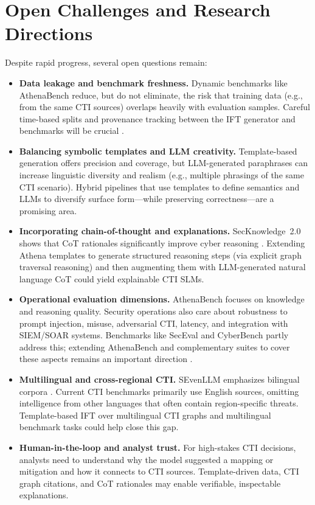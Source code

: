 \documentclass[unnumsec,webpdf,contemporary,large]{oup-authoring-template}
\theoremstyle{thmstyleone}
\theoremstyle{thmstyletwo}
\theoremstyle{thmstylethree}
\begin{document}
\section{Open Challenges and Research Directions}
\label{sec:open-challenges}

Despite rapid progress, several open questions remain:

\begin{itemize}
  \item \textbf{Data leakage and benchmark freshness.} Dynamic benchmarks like AthenaBench reduce, but do not eliminate, the risk that training data (e.g., from the same CTI sources) overlaps heavily with evaluation samples. Careful time-based splits and provenance tracking between the IFT generator and benchmarks will be crucial \cite{alam2025athenabench,cardei2025ift}.
  \item \textbf{Balancing symbolic templates and LLM creativity.} Template-based generation offers precision and coverage, but LLM-generated paraphrases can increase linguistic diversity and realism (e.g., multiple phrasings of the same CTI scenario). Hybrid pipelines that use templates to define semantics and LLMs to diversify surface form---while preserving correctness---are a promising area.
  \item \textbf{Incorporating chain-of-thought and explanations.} SecKnowledge~2.0 shows that CoT rationales significantly improve cyber reasoning \cite{levi2025toward}. Extending Athena templates to generate structured reasoning steps (via explicit graph traversal reasoning) and then augmenting them with LLM-generated natural language CoT could yield explainable CTI SLMs.
  \item \textbf{Operational evaluation dimensions.} AthenaBench focuses on knowledge and reasoning quality. Security operations also care about robustness to prompt injection, misuse, adversarial CTI, latency, and integration with SIEM/SOAR systems. Benchmarks like SecEval and CyberBench partly address this; extending AthenaBench and complementary suites to cover these aspects remains an important direction \cite{hu2024seceval,liu2024cyberbench,alam2025athenabench}.
  \item \textbf{Multilingual and cross-regional CTI.} SEvenLLM emphasizes bilingual corpora \cite{ji2024sevenllm}. Current CTI benchmarks primarily use English sources, omitting intelligence from other languages that often contain region-specific threats. Template-based IFT over multilingual CTI graphs and multilingual benchmark tasks could help close this gap.
  \item \textbf{Human-in-the-loop and analyst trust.} For high-stakes CTI decisions, analysts need to understand why the model suggested a mapping or mitigation and how it connects to CTI sources. Template-driven data, CTI graph citations, and CoT rationales may enable verifiable, inspectable explanations.
\end{itemize}
\end{document}
